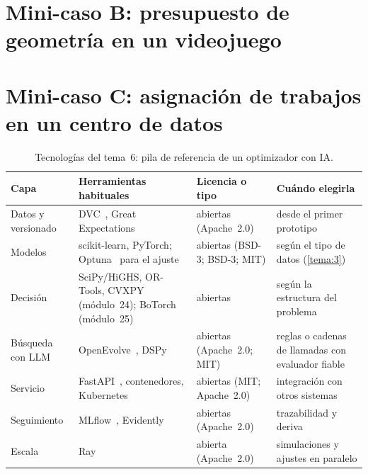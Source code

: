 \addtocounter{definicion}{1}%

\section{Mini-caso B: presupuesto de geometría en un videojuego}

\addtocounter{definicion}{1}%

\section{Mini-caso C: asignación de trabajos en un centro de datos}

\addtocounter{definicion}{1}%

\begin{table}[h]
\centering\small
\caption{Tecnologías del tema~6: pila de referencia de un optimizador con IA.}\label{tab:tec6}
\begin{tabularx}{\textwidth}{@{}>{\raggedright\arraybackslash}p{2.5cm}>{\raggedright\arraybackslash}X>{\raggedright\arraybackslash}p{2.1cm}>{\raggedright\arraybackslash}X@{}}
\toprule
Capa & Herramientas habituales & Licencia o tipo & Cuándo elegirla \\
\midrule
Datos y versionado & DVC~\cite{dvc}, Great Expectations & abiertas (Apache~2.0) & desde el primer prototipo \\
Modelos & scikit-learn, PyTorch; Optuna~\cite{optuna} para el ajuste & abiertas (BSD-3; BSD-3; MIT) & según el tipo de datos (\cref{tema:3}) \\
Decisión & SciPy/HiGHS, OR-Tools, CVXPY (módulo~24); BoTorch (módulo~25) & abiertas & según la estructura del problema \\
Búsqueda con LLM & OpenEvolve~\cite{openevolve}, DSPy~\cite{dspy} & abiertas (Apache~2.0; MIT) & reglas o cadenas de llamadas con evaluador fiable \\
Servicio & FastAPI~\cite{fastapi}, contenedores, Kubernetes~\cite{k8s} & abiertas (MIT; Apache~2.0) & integración con otros sistemas \\
Seguimiento & MLflow~\cite{mlflow}, Evidently~\cite{evidently} & abiertas (Apache~2.0) & trazabilidad y deriva \\
Escala & Ray~\cite{ray} & abierta (Apache~2.0) & simulaciones y ajustes en paralelo \\
\bottomrule
\end{tabularx}
\end{table}

\addtocounter{definicion}{1}%

